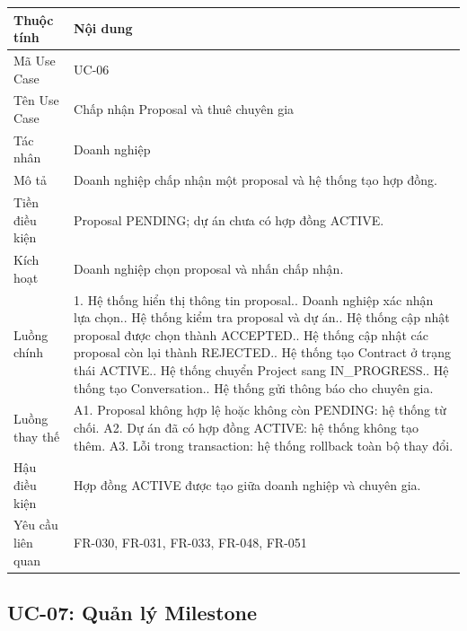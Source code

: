 \begin{longtable}{|p{3.5cm}|p{10.2cm}|}
\hline
\textbf{Thuộc tính} & \textbf{Nội dung} \\ \hline
Mã Use Case & UC-06 \\ \hline
Tên Use Case & Chấp nhận Proposal và thuê chuyên gia \\ \hline
Tác nhân & Doanh nghiệp \\ \hline
Mô tả & Doanh nghiệp chấp nhận một proposal và hệ thống tạo hợp đồng. \\ \hline
Tiền điều kiện & Proposal PENDING; dự án chưa có hợp đồng ACTIVE. \\ \hline
Kích hoạt & Doanh nghiệp chọn proposal và nhấn chấp nhận. \\ \hline
Luồng chính &
1. Hệ thống hiển thị thông tin proposal.\newline
2. Doanh nghiệp xác nhận lựa chọn.\newline
3. Hệ thống kiểm tra proposal và dự án.\newline
4. Hệ thống cập nhật proposal được chọn thành ACCEPTED.\newline
5. Hệ thống cập nhật các proposal còn lại thành REJECTED.\newline
6. Hệ thống tạo Contract ở trạng thái ACTIVE.\newline
7. Hệ thống chuyển Project sang IN\_PROGRESS.\newline
8. Hệ thống tạo Conversation.\newline
9. Hệ thống gửi thông báo cho chuyên gia. \\ \hline
Luồng thay thế &
A1. Proposal không hợp lệ hoặc không còn PENDING: hệ thống từ chối.\newline
A2. Dự án đã có hợp đồng ACTIVE: hệ thống không tạo thêm.\newline
A3. Lỗi trong transaction: hệ thống rollback toàn bộ thay đổi. \\ \hline
Hậu điều kiện & Hợp đồng ACTIVE được tạo giữa doanh nghiệp và chuyên gia. \\ \hline
Yêu cầu liên quan & FR-030, FR-031, FR-033, FR-048, FR-051 \\ \hline
\end{longtable}

\subsection{UC-07: Quản lý Milestone}


